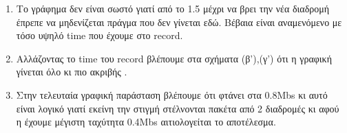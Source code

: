 \documentclass{article}
\begin{document}
\begin{enumerate}
\begin{figure}[ht!]
	\centering
		 


\end{figure}
\item
Το γράφημα δεν είναι σωστό γιατί από το 1.5 μέχρι να βρει την νέα διαδρομή έπρεπε να μηδενίζεται πράγμα που δεν γίνεται εδώ. Βέβαια είναι αναμενόμενο με τόσο υψηλό time που έχουμε στο record.
\item
Αλλάζοντας το time του record βλέπουμε στα σχήματα (β'),(γ') ότι η γραφική γίνεται όλο κι πιο ακριβής .
\item
Στην τελευταία γραφική παράσταση βλέπουμε ότι φτάνει στα 0.8Mbs κι αυτό είναι λογικό γιατί εκείνη την στιγμή στέλνονται πακέτα από 2 διαδρομές κι αφού η έχουμε μέγιστη ταχύτητα 0.4Mbs αιτιολογείται το αποτέλεσμα.


\end{enumerate}
\end{document}
